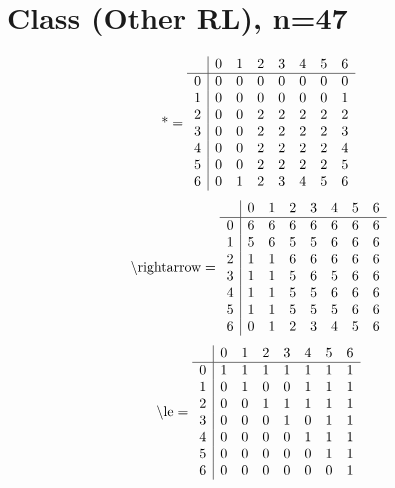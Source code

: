\documentclass[11pt]{article}
\begin{document}
\section{Class (Other RL), n=47}
\[\text{*} = 
\begin{array}{r | r r r r r r r}
 & 0 & 1 & 2 & 3 & 4 & 5 & 6 \\ \hline
0 & 0 & 0 & 0 & 0 & 0 & 0 & 0 \\
1 & 0 & 0 & 0 & 0 & 0 & 0 & 1 \\
2 & 0 & 0 & 2 & 2 & 2 & 2 & 2 \\
3 & 0 & 0 & 2 & 2 & 2 & 2 & 3 \\
4 & 0 & 0 & 2 & 2 & 2 & 2 & 4 \\
5 & 0 & 0 & 2 & 2 & 2 & 2 & 5 \\
6 & 0 & 1 & 2 & 3 & 4 & 5 & 6 \\
\end{array}
\]
\[\text{\textbackslash rightarrow} = 
\begin{array}{r | r r r r r r r}
 & 0 & 1 & 2 & 3 & 4 & 5 & 6 \\ \hline
0 & 6 & 6 & 6 & 6 & 6 & 6 & 6 \\
1 & 5 & 6 & 5 & 5 & 6 & 6 & 6 \\
2 & 1 & 1 & 6 & 6 & 6 & 6 & 6 \\
3 & 1 & 1 & 5 & 6 & 5 & 6 & 6 \\
4 & 1 & 1 & 5 & 5 & 6 & 6 & 6 \\
5 & 1 & 1 & 5 & 5 & 5 & 6 & 6 \\
6 & 0 & 1 & 2 & 3 & 4 & 5 & 6 \\
\end{array}
\]
\[\text{\textbackslash le} = 
\begin{array}{r | r r r r r r r}
 & 0 & 1 & 2 & 3 & 4 & 5 & 6 \\ \hline
0 & 1 & 1 & 1 & 1 & 1 & 1 & 1 \\
1 & 0 & 1 & 0 & 0 & 1 & 1 & 1 \\
2 & 0 & 0 & 1 & 1 & 1 & 1 & 1 \\
3 & 0 & 0 & 0 & 1 & 0 & 1 & 1 \\
4 & 0 & 0 & 0 & 0 & 1 & 1 & 1 \\
5 & 0 & 0 & 0 & 0 & 0 & 1 & 1 \\
6 & 0 & 0 & 0 & 0 & 0 & 0 & 1 \\
\end{array}
\]
\end{document}
